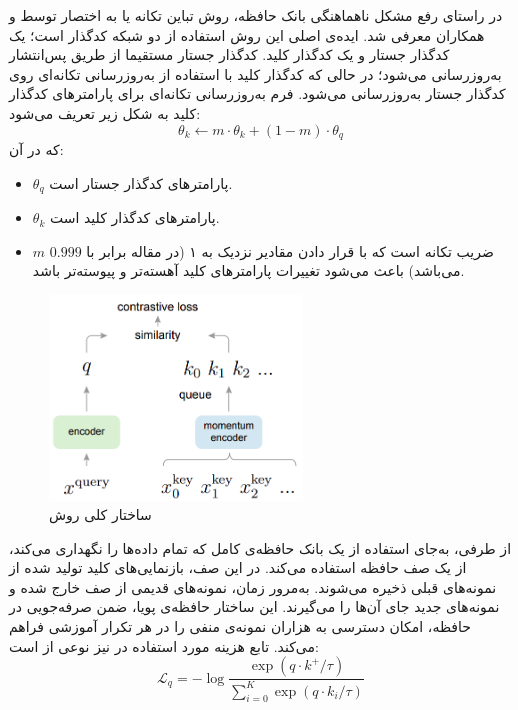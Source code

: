 در راستای رفع مشکل ناهماهنگی بانک حافظه، روش تباین تکانه یا به اختصار
توسط  و همکاران\cite{he2020momentum} معرفی شد.
ایده‌ی اصلی این روش استفاده از دو شبکه کدگذار است؛
یک کدگذار جستار
و یک کدگذار کلید.
کدگذار جستار مستقیما از طریق پس‌انتشار به‌روزرسانی می‌شود؛ در حالی که کدگذار کلید با استفاده از به‌روزرسانی تکانه‌ای روی کدگذار جستار به‌روزرسانی می‌شود. فرم به‌روزرسانی تکانه‌ای برای پارامترهای کدگذار کلید به شکل زیر تعریف می‌شود:
\begin{equation}
\theta_k \leftarrow m \cdot \theta_k + (1 - m) \cdot \theta_q
\end{equation}
که در آن:
\begin{itemize}
    \item $\theta_q$ پارامترهای کدگذار جستار است.
    \item $\theta_k$ پارامترهای کدگذار کلید است.
    \item $m$ ضریب تکانه است که با قرار دادن مقادیر نزدیک به ۱ (در مقاله برابر با $0.999$ می‌باشد) باعث می‌شود تغییرات پارامترهای کلید آهسته‌تر و پیوسته‌تر باشد.
\end{itemize}
\begin{figure}[htb!]
\centering
\includegraphics[width=0.6\textwidth]{Images/Chapter2/moco.png}
\caption{ساختار کلی روش }
\label{fig:moco}
\end{figure}
از طرفی، 
به‌جای استفاده از یک بانک حافظه‌ی کامل که تمام داده‌ها را نگهداری می‌کند،
از یک صف حافظه
استفاده می‌کند. در این صف، بازنمایی‌های کلید تولید شده از نمونه‌های قبلی ذخیره می‌شوند. به‌مرور زمان، نمونه‌های قدیمی از صف خارج شده و نمونه‌های جدید جای آن‌ها را می‌گیرند. این ساختار حافظه‌ی پویا، ضمن صرفه‌جویی در حافظه، امکان دسترسی به هزاران نمونه‌ی منفی را در هر تکرار آموزشی فراهم می‌کند. تابع هزینه مورد استفاده در 
نیز نوعی از  است:
\begin{equation}
\mathcal{L}_q = -\log \frac{\exp(q \cdot k^+ / \tau)}{\sum_{i=0}^{K} \exp(q \cdot k_i / \tau)}
\end{equation}
